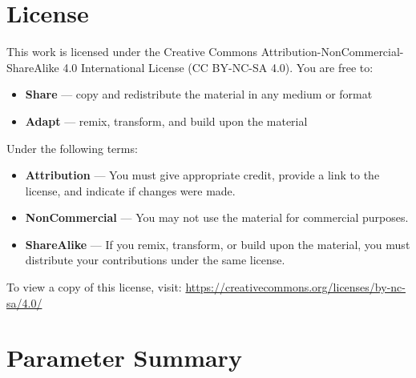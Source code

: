 \documentclass[11pt]{article}
\begin{document}
\section*{License}
This work is licensed under the Creative Commons Attribution-NonCommercial-ShareAlike 4.0 International License (CC BY-NC-SA 4.0).  
You are free to:
\begin{itemize}
  \item \textbf{Share} — copy and redistribute the material in any medium or format
  \item \textbf{Adapt} — remix, transform, and build upon the material
\end{itemize}
Under the following terms:
\begin{itemize}
  \item \textbf{Attribution} — You must give appropriate credit, provide a link to the license, and indicate if changes were made.
  \item \textbf{NonCommercial} — You may not use the material for commercial purposes.
  \item \textbf{ShareAlike} — If you remix, transform, or build upon the material, you must distribute your contributions under the same license.
\end{itemize}

To view a copy of this license, visit:  
\href{https://creativecommons.org/licenses/by-nc-sa/4.0/}{https://creativecommons.org/licenses/by-nc-sa/4.0/}

\section*{Parameter Summary}
\end{document}

